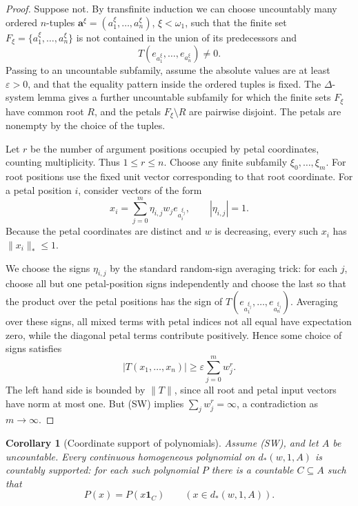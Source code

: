 \documentclass[11pt]{article}
\newtheorem{corollary}{Corollary}
\newcommand{\eps}{\varepsilon}
\begin{document}
\begin{proof}
Suppose not.  By transfinite induction we can choose uncountably many ordered
\(n\)-tuples \(\mathbf a^\xi=(a_1^\xi,\ldots,a_n^\xi)\), \(\xi<\omega_1\),
such that the finite set \(F_\xi=\{a_1^\xi,\ldots,a_n^\xi\}\) is not contained
in the union of its predecessors and
\[
  T(e_{a_1^\xi},\ldots,e_{a_n^\xi})\ne0.
\]
Passing to an uncountable subfamily, assume the absolute values are at least
\(\eps>0\), and that the equality pattern inside the ordered tuples is fixed.
The \(\Delta\)-system lemma gives a further uncountable subfamily for which
the finite sets \(F_\xi\) have common root \(R\), and the petals
\(F_\xi\setminus R\) are pairwise disjoint.  The petals are nonempty by the
choice of the tuples.

Let \(r\) be the number of argument positions occupied by petal coordinates,
counting multiplicity.  Thus \(1\le r\le n\).  Choose any finite subfamily
\(\xi_0,\ldots,\xi_m\).  For root positions use the fixed unit vector
corresponding to that root coordinate.  For a petal position \(i\), consider
vectors of the form
\[
  x_i=\sum_{j=0}^m \eta_{i,j} w_j e_{a_i^{\xi_j}},
  \qquad |\eta_{i,j}|=1.
\]
Because the petal coordinates are distinct and \(w\) is decreasing, every such
\(x_i\) has \(\|x_i\|_*\le1\).

We choose the signs \(\eta_{i,j}\) by the standard random-sign averaging
trick: for each \(j\), choose all but one petal-position signs independently
and choose the last so that the product over the petal positions has the sign
of \(T(e_{a_1^{\xi_j}},\ldots,e_{a_n^{\xi_j}})\).  Averaging over these signs,
all mixed terms with petal indices not all equal have expectation zero, while
the diagonal petal terms contribute positively.  Hence some choice of signs
satisfies
\[
  |T(x_1,\ldots,x_n)|
  \ge
  \eps\sum_{j=0}^m w_j^r .
\]
The left hand side is bounded by \(\|T\|\), since all root and petal input
vectors have norm at most one.  But (SW) implies
\(\sum_j w_j^r=\infty\), a contradiction as \(m\to\infty\).
\end{proof}

\begin{corollary}[Coordinate support of polynomials]\label{cor:poly}
Assume (SW), and let \(A\) be uncountable.  Every continuous homogeneous
polynomial on \(d_*(w,1,A)\) is countably supported: for each such polynomial
\(P\) there is a countable \(C\subseteq A\) such that
\[
  P(x)=P(x\mathbf 1_C)\qquad (x\in d_*(w,1,A)).
\]
\end{corollary}
\end{document}

